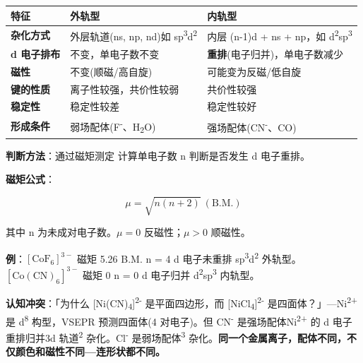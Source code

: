 {\def\LTcaptype{none} %
\begin{longtable}[]{@{}
  >{\raggedright\arraybackslash}p{}
  >{\raggedright\arraybackslash}p{}
  >{\raggedright\arraybackslash}p{}@{}}
\toprule\noalign{}
\begin{minipage}[b]{\linewidth}\raggedright
特征
\end{minipage} & \begin{minipage}[b]{\linewidth}\raggedright
外轨型
\end{minipage} & \begin{minipage}[b]{\linewidth}\raggedright
内轨型
\end{minipage} \\
\midrule\noalign{}
\endhead
\bottomrule\noalign{}
\endlastfoot
\textbf{杂化方式} & 外层轨道(ns, np, nd)如 sp\textsuperscript{3}d\textsuperscript{2} & 内层 (n-1)d + ns + np，如 d\textsuperscript{2}sp\textsuperscript{3} \\
\textbf{d 电子排布} & 不变，单电子数不变 & \textbf{重排}(电子归并)，单电子数减少 \\
\textbf{磁性} & 不变(顺磁/高自旋) & 可能变为反磁/低自旋 \\
\textbf{键的性质} & 离子性较强，共价性较弱 & 共价性较强 \\
\textbf{稳定性} & 稳定性较差 & 稳定性较好 \\
\textbf{形成条件} & 弱场配体(F\textsuperscript{-}、H\textsubscript{2}O) & 强场配体(CN\textsuperscript{-}、CO) \\
\end{longtable}
}

\textbf{判断方法}：通过磁矩测定 \箭 计算单电子数 n \箭 判断是否发生 d 电子重排。

\textbf{磁矩公式}：

\[
\mu = \sqrt{n(n+2)}\ (\text{B.M.})
\]

其中 n 为未成对电子数。\(\mu = 0\) \箭 反磁性；\(\mu > 0\) \箭 顺磁性。

\textbf{例}：\([\mathrm{CoF_6}]^{3-}\) 磁矩 5.26 B.M. \箭 n = 4 \箭 d 电子未重排 \箭 sp\textsuperscript{3}d\textsuperscript{2} 外轨型。
\([\mathrm{Co(CN)_6}]^{3-}\) 磁矩 0 \箭 n = 0 \箭 d 电子归并 \箭 d\textsuperscript{2}sp\textsuperscript{3} 内轨型。

\textbf{认知冲突}：「为什么 {[}Ni(CN)\textsubscript{4}{]}\textsuperscript{2-} 是平面四边形，而 {[}NiCl\textsubscript{4}{]}\textsuperscript{2-} 是四面体？」---Ni\textsuperscript{2+} 是 d\textsuperscript{8} 构型，VSEPR 预测四面体(4 对电子)。但 CN\textsuperscript{-} 是强场配体 Ni\textsuperscript{2+} 的 d 电子重排归并 3d 轨道\textsuperscript{2} 杂化。Cl\textsuperscript{-} 是弱场配体\textsuperscript{3} 杂化。\textbf{同一个金属离子，配体不同，不仅颜色和磁性不同---连形状都不同。}

